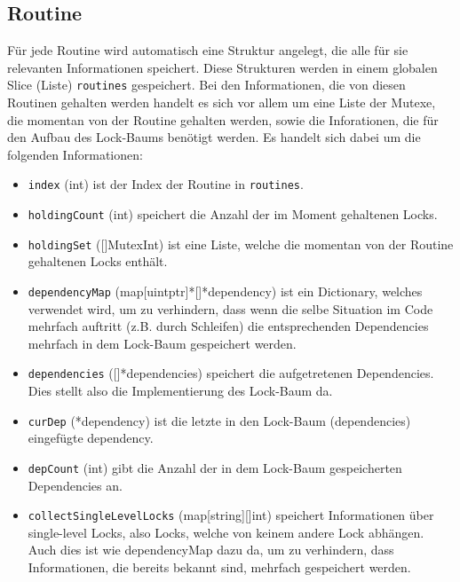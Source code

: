 \subsection{Routine}
Für jede Routine wird automatisch eine Struktur angelegt, die alle für sie 
relevanten Informationen speichert. Diese Strukturen werden in einem 
globalen Slice (Liste) \texttt{routines} gespeichert. Bei den Informationen, die von 
diesen Routinen gehalten werden handelt es 
sich vor allem um eine Liste der Mutexe, die momentan von der Routine 
gehalten werden, sowie die Inforationen, die für den Aufbau des Lock-Baums 
benötigt werden. Es handelt sich dabei um die folgenden Informationen:
\begin{itemize}
  \item \texttt{index} (int) ist der Index der Routine in \texttt{routines}.
  \item \texttt{holdingCount} (int) speichert die Anzahl der im Moment gehaltenen Locks.
  \item \texttt{holdingSet} ([]MutexInt) ist eine Liste, welche die
    momentan von der Routine gehaltenen Locks enthält.
  \item \texttt{dependencyMap} (map[uintptr]*[]*dependency) ist ein Dictionary, welches 
   verwendet wird, um zu verhindern, dass wenn die selbe Situation im Code 
   mehrfach auftritt (z.B. durch Schleifen) die entsprechenden Dependencies 
   mehrfach in dem Lock-Baum gespeichert werden.
  \item \texttt{dependencies} ([]*dependencies) speichert die aufgetretenen Dependencies.
   Dies stellt also die Implementierung des Lock-Baum da.
  \item \texttt{curDep} (*dependency) ist die letzte in den Lock-Baum (dependencies)
   eingefügte dependency.
  \item \texttt{depCount} (int) gibt die Anzahl der in dem Lock-Baum gespeicherten 
   Dependencies an.
  \item \texttt{collectSingleLevelLocks} (map[string][]int) speichert Informationen
   über single-level Locks, 
   also Locks, welche von keinem andere Lock abhängen. Auch dies ist wie 
   dependencyMap dazu da, um zu verhindern, dass Informationen, die
   bereits bekannt sind, mehrfach gespeichert werden. 
\end{itemize}

